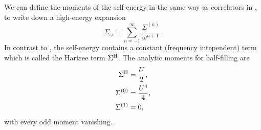 We can define the moments of the self-energy in the same way as correlators in ,
to write down a high-energy expansion~\cite{Potthoff1997}
\begin{equation}
    \Sigma_\omega = \sum_{n=-1}^\infty \frac{\Sigma^{(n)}}{\omega^{n+1}}.
\end{equation}
In contrast to ,
the self-energy contains a constant (frequency intependent) term
which is called the Hartree term $\Sigma^{\mathrm{H}}$.
The analytic moments for half-filling are~\cite{Potthoff1997}
\begin{subequations}
    \begin{align}
        \Sigma^{\mathrm{H}}   & = \frac{U}{2},   \\
        \Sigma^{(0)} & = \frac{U^4}{4}, \\
        \Sigma^{(1)} & = 0,
    \end{align}%
    \label{eq:self-energy-moments}%
\end{subequations}
with every odd moment vanishing.

